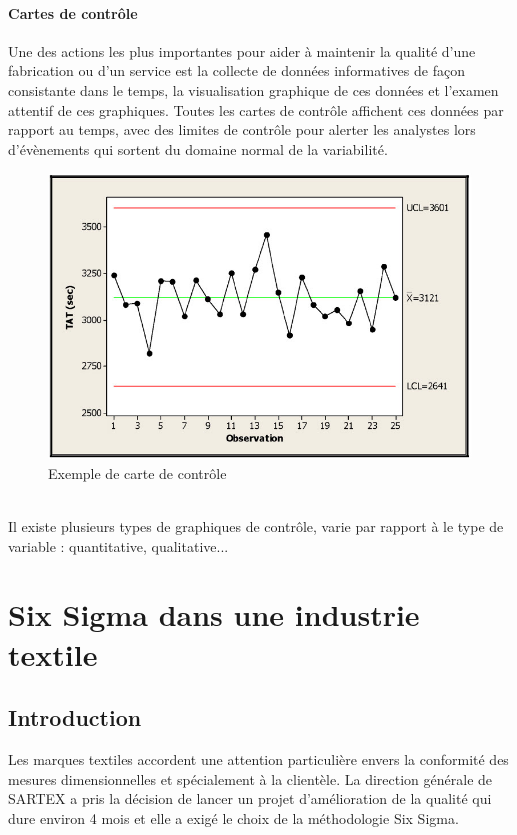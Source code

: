 \documentclass[12pt, a4paper]{thesis}
\begin{document}
\subsubsection{Cartes de contrôle}
Une des actions les plus importantes pour aider à maintenir la qualité d'une fabrication ou d'un service est la collecte de données informatives de façon consistante dans le temps, la visualisation graphique de ces données et l'examen attentif de ces graphiques. Toutes les cartes de contrôle affichent ces données par rapport au temps, avec des limites de contrôle pour alerter les analystes lors d'évènements qui sortent du domaine normal de la variabilité.\\
\begin{figure}[!h]
\begin{center}
        \includegraphics[scale=0.5]{carte.jpg}
        \caption{Exemple de carte de contrôle}
\end{center}
\end{figure}\\
Il existe plusieurs types de graphiques de contrôle, varie par rapport à le type de variable : quantitative, qualitative...\\








\chapter{Six Sigma dans une industrie textile }
\section*{Introduction}
Les marques textiles accordent une attention particulière envers la conformité des mesures dimensionnelles et spécialement à la clientèle. La direction générale de SARTEX a pris la décision de lancer un projet d’amélioration de la qualité qui dure environ 4 mois et elle a exigé le choix de la méthodologie Six Sigma.
\end{document}

